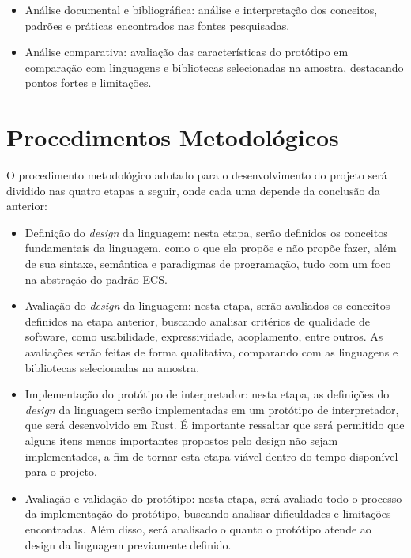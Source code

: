 \begin{itemize}
    \item Análise documental e bibliográfica: análise e interpretação dos conceitos, padrões e práticas encontrados nas fontes pesquisadas.
    \item Análise comparativa: avaliação das características do protótipo em comparação com linguagens e bibliotecas selecionadas na amostra, destacando pontos fortes e limitações.
\end{itemize}

\section{Procedimentos Metodológicos}

O procedimento metodológico adotado para o desenvolvimento do projeto será dividido nas quatro etapas a seguir, onde cada uma depende da conclusão da anterior:

\begin{itemize}
    \item Definição do \textit{design} da linguagem: nesta etapa, serão definidos os conceitos fundamentais da linguagem, como o que ela propõe e não propõe fazer, além de sua sintaxe, semântica e paradigmas de programação, tudo com um foco na abstração do padrão ECS.
    \item Avaliação do \textit{design} da linguagem: nesta etapa, serão avaliados os conceitos definidos na etapa anterior, buscando analisar critérios de qualidade de software, como usabilidade, expressividade, acoplamento, entre outros. As avaliações serão feitas de forma qualitativa, comparando com as linguagens e bibliotecas selecionadas na amostra.
    \item Implementação do protótipo de interpretador: nesta etapa, as definições do \textit{design} da linguagem serão implementadas em um protótipo de interpretador, que será desenvolvido em Rust. É importante ressaltar que será permitido que alguns itens menos importantes propostos pelo design não sejam implementados, a fim de tornar esta etapa viável dentro do tempo disponível para o projeto.
    \item Avaliação e validação do protótipo: nesta etapa, será avaliado todo o processo da implementação do protótipo, buscando analisar dificuldades e limitações encontradas. Além disso, será analisado o quanto o protótipo atende ao design da linguagem previamente definido.
\end{itemize}
